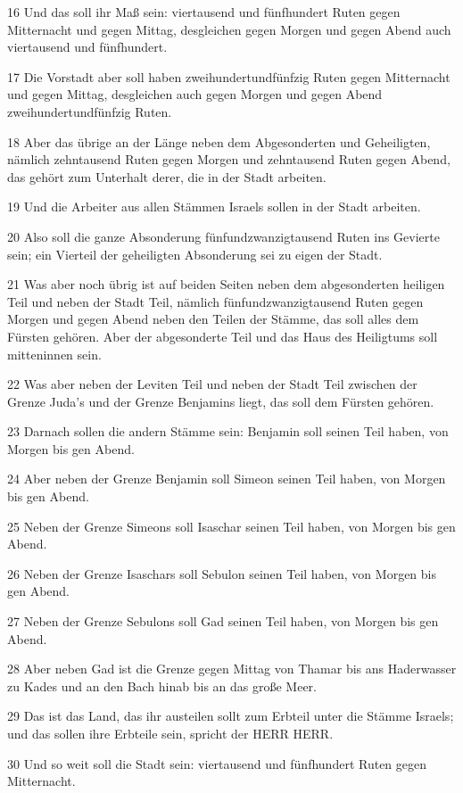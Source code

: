 \par 16 Und das soll ihr Maß sein: viertausend und fünfhundert Ruten gegen Mitternacht und gegen Mittag, desgleichen gegen Morgen und gegen Abend auch viertausend und fünfhundert.
\par 17 Die Vorstadt aber soll haben zweihundertundfünfzig Ruten gegen Mitternacht und gegen Mittag, desgleichen auch gegen Morgen und gegen Abend zweihundertundfünfzig Ruten.
\par 18 Aber das übrige an der Länge neben dem Abgesonderten und Geheiligten, nämlich zehntausend Ruten gegen Morgen und zehntausend Ruten gegen Abend, das gehört zum Unterhalt derer, die in der Stadt arbeiten.
\par 19 Und die Arbeiter aus allen Stämmen Israels sollen in der Stadt arbeiten.
\par 20 Also soll die ganze Absonderung fünfundzwanzigtausend Ruten ins Gevierte sein; ein Vierteil der geheiligten Absonderung sei zu eigen der Stadt.
\par 21 Was aber noch übrig ist auf beiden Seiten neben dem abgesonderten heiligen Teil und neben der Stadt Teil, nämlich fünfundzwanzigtausend Ruten gegen Morgen und gegen Abend neben den Teilen der Stämme, das soll alles dem Fürsten gehören. Aber der abgesonderte Teil und das Haus des Heiligtums soll mitteninnen sein.
\par 22 Was aber neben der Leviten Teil und neben der Stadt Teil zwischen der Grenze Juda's und der Grenze Benjamins liegt, das soll dem Fürsten gehören.
\par 23 Darnach sollen die andern Stämme sein: Benjamin soll seinen Teil haben, von Morgen bis gen Abend.
\par 24 Aber neben der Grenze Benjamin soll Simeon seinen Teil haben, von Morgen bis gen Abend.
\par 25 Neben der Grenze Simeons soll Isaschar seinen Teil haben, von Morgen bis gen Abend.
\par 26 Neben der Grenze Isaschars soll Sebulon seinen Teil haben, von Morgen bis gen Abend.
\par 27 Neben der Grenze Sebulons soll Gad seinen Teil haben, von Morgen bis gen Abend.
\par 28 Aber neben Gad ist die Grenze gegen Mittag von Thamar bis ans Haderwasser zu Kades und an den Bach hinab bis an das große Meer.
\par 29 Das ist das Land, das ihr austeilen sollt zum Erbteil unter die Stämme Israels; und das sollen ihre Erbteile sein, spricht der HERR HERR.
\par 30 Und so weit soll die Stadt sein: viertausend und fünfhundert Ruten gegen Mitternacht.
